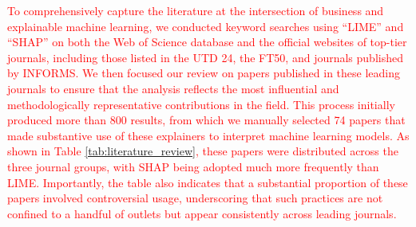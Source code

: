 \documentclass[mnsc,blindrev]{informs3}
\begin{document}





\textcolor{red}{
To comprehensively capture the literature at the intersection of business and explainable machine learning, we conducted keyword searches using “LIME” and “SHAP” on both the Web of Science database and the official websites of top-tier journals, including those listed in the UTD 24, the FT50, and journals published by INFORMS. We then focused our review on papers published in these leading journals to ensure that the analysis reflects the most influential and methodologically representative contributions in the field. This process initially produced more than 800 results, from which we manually selected 74 papers that made substantive use of these explainers to interpret machine learning models. As shown in Table \ref{tab:literature_review}, these papers were distributed across the three journal groups, with SHAP being adopted much more frequently than LIME. Importantly, the table also indicates that a substantial proportion of these papers involved controversial usage, underscoring that such practices are not confined to a handful of outlets but appear consistently across leading journals.}
\end{document}
